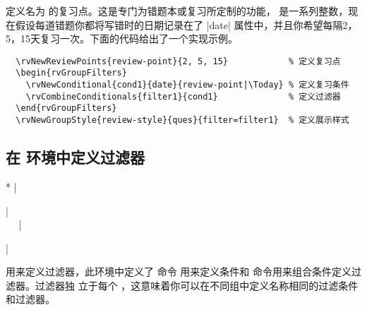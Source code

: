 \documentclass[full]{l3doc}
\begin{document}
\begin{documentation}
\begin{function}{\rvNewReviewPoints}
  \begin{syntax}
      
  \end{syntax}

  定义名为  的复习点。这是专门为错题本或复习所定制的功能，
  是一系列整数，现在假设每道错题你都将写错时的日期记录在了 |date|
  属性中，并且你希望每隔2，5，15天复习一次。下面的代码给出了一个实现示例。
\begin{verbatim}
  \rvNewReviewPoints{review-point}{2, 5, 15}            % 定义复习点
  \begin{rvGroupFilters}
    \rvNewConditional{cond1}{date}{review-point|\Today} % 定义复习条件
    \rvCombineConditionals{filter1}{cond1}              % 定义过滤器
  \end{rvGroupFilters}
  \rvNewGroupStyle{review-style}{ques}{filter=filter1}  % 定义展示样式
\end{verbatim}
\end{function}

\subsection{在  环境中定义过滤器}

\noindent{}
\begin{Syntax}*
  |\begin{rvGroupFilters}| \\
  ~~
  |\end{rvGroupFilters}| \\
\end{Syntax}

用来定义过滤器，此环境中定义了  命令
用来定义条件和  命令用来组合条件定义过滤器。过滤器独
立于每个 ，这意味着你可以在不同组中定义名称相同的过滤条件和过滤器。


\end{documentation}
\end{document}
